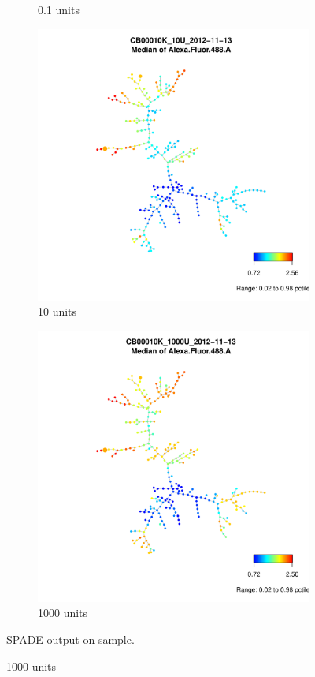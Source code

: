 \begin{figure}[h]
\begin{subfigure}[b]{.4\textwidth}
  \caption{0.1 units}
\end{subfigure}
\begin{subfigure}[b]{.4\textwidth}
  \includegraphics[scale=.4]{IL2/figures/CB00010K-10U-2012-11-13-spade.pdf}
  \caption{10 units}
\end{subfigure}
\begin{subfigure}[b]{.4\textwidth}
  \includegraphics[scale=.4]{IL2/figures/CB00010K-1000U-2012-11-13-spade.pdf}
  \caption{1000 units}
\end{subfigure}
    {SPADE output on sample.}
    {
    }
\end{figure}



